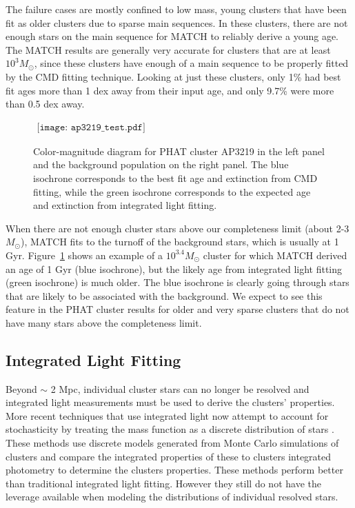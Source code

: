 \documentclass{emulateapj}
\begin{document}
The failure cases are mostly confined to low mass, young clusters that have been fit as older clusters due to sparse main sequences.  In these clusters, there are not enough stars on the main sequence for MATCH to reliably derive a young age.  The MATCH results are generally very accurate for clusters that are at least $10^3 M_{\odot}$, since these clusters have enough of a main sequence to be properly fitted by the CMD fitting technique.  Looking at just these clusters, only 1\% had best fit ages more than 1 dex away from their input age, and only 9.7\% were more than 0.5 dex away.


\begin{figure}[ht!]
   \begin{center}$
     \begin{array}{cc}
        \texttt{[image: ap3219\_test.pdf]} 
    \end{array}$
 \end{center}
  \caption{Color-magnitude diagram for PHAT cluster AP3219 in the left panel and the background population on the right panel.  The blue isochrone corresponds to the best fit age and extinction from CMD fitting, while the green isochrone corresponds to the expected age and extinction from integrated light fitting.}
  \label{fig:ap3219}
\end{figure}


When there are not enough cluster stars above our completeness limit (about 2-3 $M_{\odot}$), MATCH fits to the turnoff of the background stars, which is usually at 1 Gyr.  Figure~\ref{fig:ap3219} shows an example of a $10^{3.4} M_{\odot}$ cluster for which MATCH derived an age of 1 Gyr (blue isochrone), but the likely age from integrated light fitting (green isochrone) is much older.  The blue isochrone is clearly going through stars that are likely to be associated with the background.  We expect to see this feature in the PHAT cluster results for older and  very sparse clusters that do not have many stars above the completeness limit.
  


\subsection{Integrated Light Fitting}\label{sec:intlight}
Beyond $\sim$ 2 Mpc, individual cluster stars can no longer be resolved and integrated light measurements must be used to derive the clusters' properties.  More recent techniques that use integrated light now attempt to account for stochasticity by treating the mass function as a discrete distribution of stars \citep{Fouesneau10, Popescu10a, Deveikis08, daSilva12}.  These methods use discrete models generated from Monte Carlo simulations of clusters and compare the integrated properties of these to clusters integrated photometry to determine the clusters properties.  These methods perform better than traditional integrated light fitting.  However they still do not have the leverage available when modeling the distributions of individual resolved stars.
\end{document}
